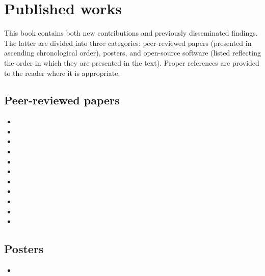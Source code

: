 \section*{Published works}
This book contains both new contributions and previously disseminated findings. The latter are divided into three categories: peer-reviewed papers (presented in ascending chronological order), posters, and open-source software (listed reflecting the order in which they are presented in the text). Proper references are provided to the reader where it is appropriate.

\sloppy
\subsection*{Peer-reviewed papers}
\begin{itemize}
  \item {}
  \item {}
  \item {}
  \item {}
  \item {}
  \item {}
  \item {}
  \item {}
  \item {}
  \item {}
  \item {}
\end{itemize}

\subsection*{Posters}
\begin{itemize}
  \item {}
\end{itemize}

